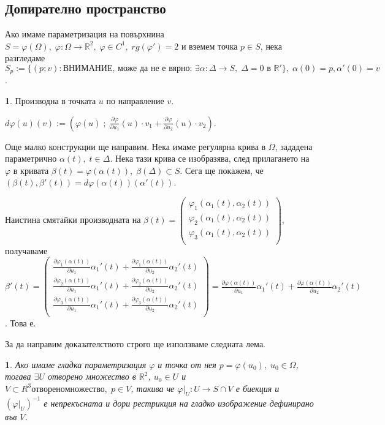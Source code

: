 \documentclass[11pt]{article}
\numberwithin{equation}{section}
\numberwithin{figure}{section}
\numberwithin{table}{section}
\theoremstyle{plain}
\theoremstyle{definition}
\newtheorem{defn}[thm]{\protect\definitionname}
\theoremstyle{remark}
\theoremstyle{definition}
\theoremstyle{remark}
\theoremstyle{plain}
\newtheorem{lem}[thm]{\protect\lemmaname}
\theoremstyle{definition}
\theoremstyle{definition}
\theoremstyle{plain}
\theoremstyle{plain}
\theoremstyle{plain}
\theoremstyle{definition}
\theoremstyle{plain}
\providecommand{\definitionname}{Дефиниция}
\providecommand{\lemmaname}{Лема}
\newcommand*{\R}{\mathbb{R}}
\newcommand*{\p}{\partial}
\begin{document}
\subsection{Допирателно пространство}
Ако имаме параметризация на повърхнина $S = \varphi(\Omega), \; \varphi:\Omega\rightarrow \R^2, \; \varphi \in C^1, \; rg(\varphi')=2$ и вземем точка $p\in S$, нека разгледаме $S_p:=\{(p;v):\text{ВНИМАНИЕ, може да не е вярно: }\exists \alpha:\Delta\rightarrow S, \; \Delta = 0 \text{ в } \R'\}, \; \alpha(0)=p, \alpha'(0)=v$.

\begin{defn} Производна в точката $u$ по направление $v$. 

$d\varphi(u)(v) := (\varphi(u)\; ; \;\frac{\p\varphi}{\p u_1}(u)\cdot v_1+\frac{\p\varphi}{\p u_2}(u)\cdot v_2)$.
\end{defn}

Още малко конструкции ще направим. Нека имаме регулярна крива в $\Omega$, зададена параметрично $\alpha(t), \; t\in\Delta$. Нека тази крива се изобразява, след прилагането на $\varphi$ в кривата $\beta(t) = \varphi(\alpha(t)), \; \beta(\Delta)\subset S$. Сега ще покажем, че $(\beta(t), \beta'(t)) = d\varphi(\alpha(t))(\alpha'(t))$.

Наистина смятайки производната на $\beta(t) = \begin{pmatrix}
	\varphi_1(\alpha_1(t),\alpha_2(t))\\
	\varphi_2(\alpha_1(t),\alpha_2(t))\\
	\varphi_3(\alpha_1(t),\alpha_2(t))\\
\end{pmatrix}$, получаваме $\beta'(t) = \begin{pmatrix}
	\frac{\p\varphi_1(\alpha(t))}{\p u_1}\alpha_1'(t)+\frac{\p\varphi_1(\alpha(t))}{\p u_2}\alpha_2'(t)\\
	\frac{\p\varphi_2(\alpha(t))}{\p u_1}\alpha_1'(t)+\frac{\p\varphi_2(\alpha(t))}{\p u_2}\alpha_2'(t)\\
	\frac{\p\varphi_3(\alpha(t))}{\p u_1}\alpha_1'(t)+\frac{\p\varphi_3(\alpha(t))}{\p u_2}\alpha_2'(t)\\
\end{pmatrix} = \frac{\p\varphi(\alpha(t))}{\p u_1}\alpha_1'(t)+\frac{\p\varphi(\alpha(t))}{\p u_2}\alpha_2'(t)$. Това е.

За да направим доказателството строго ще използваме следната лема.

\begin{lem}
Ако имаме гладка параметризация $\varphi$ и точка от нея $p=\varphi(u_0), \;u_0\in\Omega$, тогава $\exists U$ отворено множество в $\R^2$, $u_0\in U$ и $V\subset R^3 отворено множество, \; p\in V$, такива че $\varphi|_U:U\rightarrow S\cap V$ е биекция и $(\varphi|_U)^{-1}$ е непрекъсната и дори рестрикция на гладко изображение дефинирано във $V$.
\end{lem}
\end{document}
